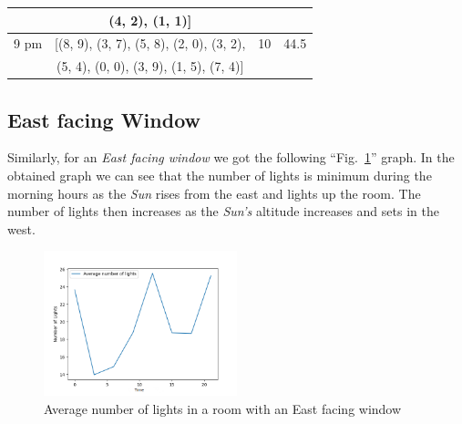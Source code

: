 \documentclass[conference]{IEEEtran}
\begin{document}
\begin{table}[htbp]
\begin{center}
\begin{tabular}{|c|c|c|c|}
                          & (4, 2), (1, 1)]                                          &                     &                           \\
            \hline
            9 pm          & [(8, 9), (3, 7), (5, 8), (2, 0), (3, 2), & 10                  & 44.5                      \\
                          &  (5, 4), (0, 0), (3, 9), (1, 5), (7, 4)]                                  &                     &                           \\
            \hline
        \end{tabular}
        \label{n_hourly_table}
    \end{center}
\end{table}

\subsection{East facing Window}
Similarly, for an \textit{East facing window} we got the following ``Fig.~\ref{n_hourly_obsless_e}'' graph.
In the obtained graph we can see that the number of lights is minimum during the morning hours as the \textit{Sun}
rises from the east and lights up the room. The number of lights then increases as the \textit{Sun's} altitude increases
and sets in the west.
\begin{figure}[htbp]
    \centerline{\includegraphics[width=0.5\textwidth]{n_hourly_obsless_e.png}}
    \caption{Average number of lights in a room with an East facing window}
    \label{n_hourly_obsless_e}
\end{figure}
\end{document}
